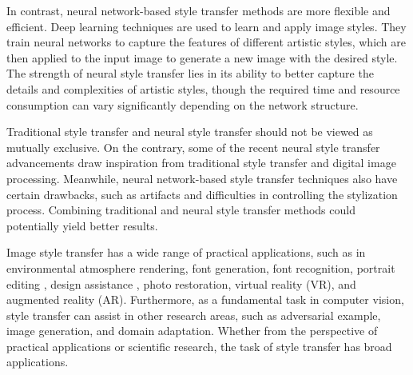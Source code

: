 In contrast, neural network-based style transfer methods are more flexible and efficient. Deep learning techniques are used to learn and apply image styles. They train neural networks to capture the features of different artistic styles, which are then applied to the input image to generate a new image with the desired style. The strength of neural style transfer lies in its ability to better capture the details and complexities of artistic styles, though the required time and resource consumption can vary significantly depending on the network structure.

Traditional style transfer and neural style transfer should not be viewed as mutually exclusive. On the contrary, some of the recent neural style transfer advancements\citep{03li2023frequency,04huang2017arbitrary} draw inspiration from traditional style transfer and digital image processing. Meanwhile, neural network-based style transfer techniques also have certain drawbacks, such as artifacts and difficulties in controlling the stylization process. Combining traditional and neural style transfer methods could potentially yield better results.

Image style transfer has a wide range of practical applications, such as in environmental atmosphere rendering\citep{05ke2023neural}, font generation\citep{06fu2023neural}, font recognition\citep{07tang2022few}, portrait editing \citep{08liu2021psgan++,09xu2022transeditor}, design assistance \citep{10liu2021self,11bae2023unsupervised,12hollein2022stylemesh,13yin20213dstylenet,14yang2022industrial}, photo restoration\citep{15gunawan2023modernizing}, virtual reality (VR), and augmented reality (AR)\citep{16mu20223d}.
Furthermore, as a fundamental task in computer vision, style transfer can assist in other research areas, such as adversarial example\citep{17naseer2022stylized,18cao2023stylefool}, image generation\citep{19karras2019style}, and domain adaptation\citep{20guan2022cdtnet}. Whether from the perspective of practical applications or scientific research, the task of style transfer has broad applications.


